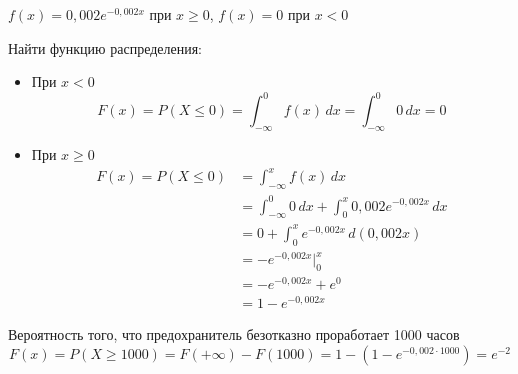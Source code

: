 \begin{exercise}[4]
	$f(x) = 0,002e^{-0,002x}$ при $x \geq 0$, $f(x) = 0$ при $x < 0$
	
	Найти функцию распределения:
	\begin{itemize}
		\item При $x < 0$
		$$F(x) = P(X \leq 0) = \int_{-\infty}^{0}f(x)\,dx = \int_{-\infty}^{0}0\,dx = 0$$
		\item При $x \geq 0$
		\begin{align*}
			F(x) = P(X \leq 0) & = \int_{-\infty}^{x}f(x)\,dx \\ & = \int_{-\infty}^{0}0\,dx + \int_{0}^{x}0,002e^{-0,002x}\,dx \\ & = 0 + \int_{0}^{x}e^{-0,002x}\,d(0,002x) \\ & = -e^{-0,002x}\Big|^{x}_{0} \\ & = -e^{-0,002x} + e^{0} \\ & = 1 - e^{-0,002x}
		\end{align*}
	\end{itemize}
	Вероятность того, что предохранитель безотказно проработает 1000 часов
		$$F(x) = P(X \geq 1000) = F(+\infty) - F(1000) = 1 - (1 - e^{-0,002 \cdot 1000}) = e^{-2}$$
\end{exercise}

